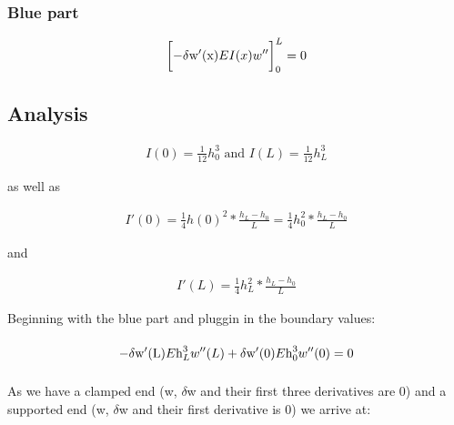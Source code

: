 \subsubsection{Blue part}

\begin{equation}
    \begin{split}
        \left[-\mathrm{\delta w'(x)}\vphantom{\int}EI(x)w''\right]_0^L = 0
    \end{split}
\end{equation}

\subsection{Analysis}

\begin{equation}
    \begin{split}
        I(0) = \frac{1}{12}h_0^3 \text{ and } I(L) = \frac{1}{12}h_L^3
    \end{split}
\end{equation}

as well as

\begin{equation}
    \begin{split}
        I'(0) = \frac{1}{4}h(0)^2*\frac{h_L - h_0}{L} = \frac{1}{4}h_0^2*\frac{h_L - h_0}{L}
    \end{split}
\end{equation}

and

\begin{equation}
    \begin{split}
        I'(L) = \frac{1}{4}h_L^2*\frac{h_L - h_0}{L}
    \end{split}
\end{equation}

Beginning with the blue part and pluggin in the boundary values:

\begin{equation}
    \begin{split}
        -\mathrm{\delta w'(L)}\vphantom{\int}E\text{h}_L^3w''(L) + \mathrm{\delta w'(0)}\vphantom{\int}E\text{h}_0^3w''(0) = 0
    \end{split}
\end{equation}

As we have a clamped end (w, $\delta$w and their first three derivatives are 0) and a supported end (w, $\delta$w and their first derivative is 0) we arrive at:

